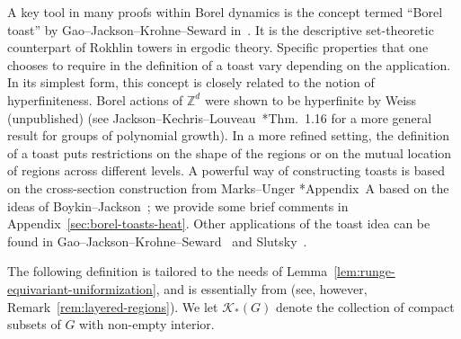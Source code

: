 \documentclass[12pt]{paper}
\numberwithin{equation}{section}
\theoremstyle{plain}
\theoremstyle{definition}
\newcommand{\Z}{\mathbb{Z}}
\newcommand{\vietoris}[2][]{\mathcal{K}_{#1}(#2)}
\begin{document}
A key tool in many proofs within Borel dynamics is the concept termed ``Borel toast'' by
Gao--Jackson--Krohne--Seward in~\cite{gaoForcingConstructionsCountable2022}.  It is the descriptive
set-theoretic counterpart of Rokhlin towers in ergodic theory.  Specific properties that one chooses
to require in the definition of a toast vary depending on the application.  In its simplest form,
this concept is closely related to the notion of hyperfiniteness. Borel actions of \(\Z^{d}\) were
shown to be hyperfinite by Weiss (unpublished) (see
Jackson--Kechris--Louveau~\cite{jacksonCountableBorelEquivalence2002}*{Thm.~1.16} for a more general
result for groups of polynomial growth).  In a more refined setting, the definition of a toast puts
restrictions on the shape of the regions or on the mutual location of regions across different
levels.  A powerful way of constructing toasts is based on the cross-section construction from
Marks--Unger \cite{marksBorelCircleSquaring2017}*{Appendix~A} based on the ideas of
Boykin--Jackson~\cite{boykinBorelBoundednessLattice2007}; we provide some brief comments in
Appendix~\ref{sec:borel-toasts-heat}.  Other applications of the toast idea can be found in
Gao--Jackson--Krohne--Seward~\cites{gaoForcingConstructionsCountable2022,gaoBorelCombinatoricsAbelian2024,
  gaoContinuousCombinatoricsAbelian2023} and Slutsky~\cite{MR4215747}.

The following definition is tailored to the needs of
Lemma~\ref{lem:runge-equivariant-uniformization}, and is essentially from \cite{MR4215747} (see,
however, Remark~\ref{rem:layered-regions}).  We let \(\vietoris[*]{G}\) denote the collection of
compact subsets of \(G\) with non-empty interior.
\end{document}
